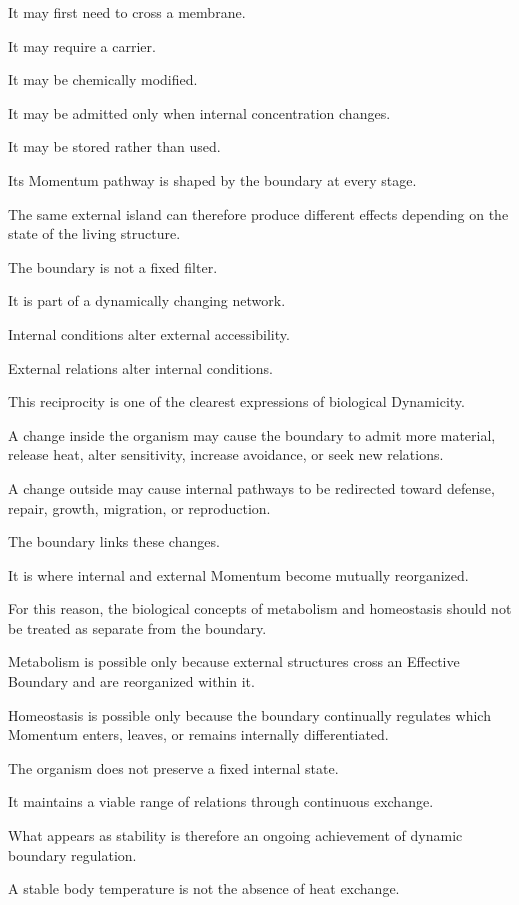 It may first need to cross a membrane.

It may require a carrier.

It may be chemically modified.

It may be admitted only when internal concentration changes.

It may be stored rather than used.

Its Momentum pathway is shaped by the boundary at every stage.

The same external island can therefore produce different effects depending on the state of the living structure.

The boundary is not a fixed filter.

It is part of a dynamically changing network.

Internal conditions alter external accessibility.

External relations alter internal conditions.

This reciprocity is one of the clearest expressions of biological Dynamicity.

A change inside the organism may cause the boundary to admit more material, release heat, alter sensitivity, increase avoidance, or seek new relations.

A change outside may cause internal pathways to be redirected toward defense, repair, growth, migration, or reproduction.

The boundary links these changes.

It is where internal and external Momentum become mutually reorganized.

For this reason, the biological concepts of metabolism and homeostasis should not be treated as separate from the boundary.

Metabolism is possible only because external structures cross an Effective Boundary and are reorganized within it.

Homeostasis is possible only because the boundary continually regulates which Momentum enters, leaves, or remains internally differentiated.

The organism does not preserve a fixed internal state.

It maintains a viable range of relations through continuous exchange.

What appears as stability is therefore an ongoing achievement of dynamic boundary regulation.

A stable body temperature is not the absence of heat exchange.

